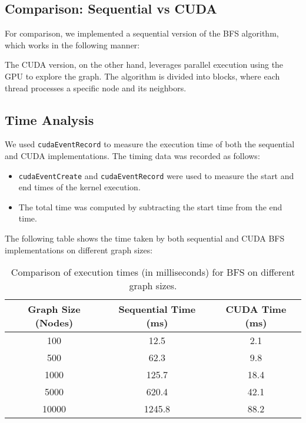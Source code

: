 \documentclass[a4paper,12pt]{article}
\begin{document}
\begin{center}
\subsection*{Comparison: Sequential vs CUDA}
For comparison, we implemented a sequential version of the BFS algorithm, which works in the following manner:

The CUDA version, on the other hand, leverages parallel execution using the GPU to explore the graph. The algorithm is divided into blocks, where each thread processes a specific node and its neighbors.
\newpage
\subsection*{Time Analysis}
We used \texttt{cudaEventRecord} to measure the execution time of both the sequential and CUDA implementations. The timing data was recorded as follows:

\begin{itemize}
    \item \texttt{cudaEventCreate} and \texttt{cudaEventRecord} were used to measure the start and end times of the kernel execution.
    \item The total time was computed by subtracting the start time from the end time.
\end{itemize}

The following table shows the time taken by both sequential and CUDA BFS implementations on different graph sizes:

\begin{table}[ht]
\centering
\begin{tabular}{|c|c|c|}
\hline
\textbf{Graph Size (Nodes)} & \textbf{Sequential Time (ms)} & \textbf{CUDA Time (ms)} \\
\hline
100 & 12.5 & 2.1 \\
500 & 62.3 & 9.8 \\
1000 & 125.7 & 18.4 \\
5000 & 620.4 & 42.1 \\
10000 & 1245.8 & 88.2 \\
\hline
\end{tabular}
\caption{Comparison of execution times (in milliseconds) for BFS on different graph sizes.}
\end{table}

\end{center}
\end{document}
